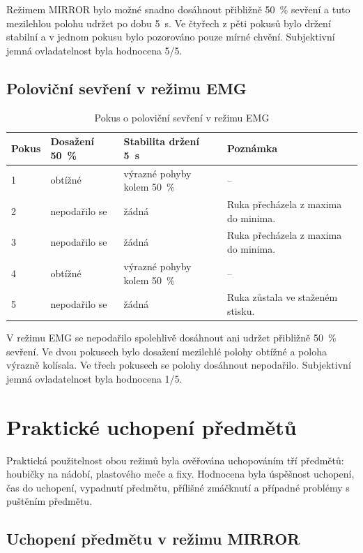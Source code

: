 Režimem MIRROR bylo možné snadno dosáhnout přibližně 50~\% sevření a tuto mezilehlou polohu udržet po dobu 5~s. Ve čtyřech z pěti pokusů bylo držení stabilní a v jednom pokusu bylo pozorováno pouze mírné chvění. Subjektivní jemná ovladatelnost byla hodnocena 5/5.

\subsection{Poloviční sevření v režimu EMG}
\label{subsec:polovicni-emg}

\begin{table}[H]
\centering
\caption{Pokus o poloviční sevření v režimu EMG}
\label{tab:emg-polovicni-sevreni}
\setlength{\tabcolsep}{2pt}
\begin{tabular}{|p{}|p{}|p{}|p{}|}
\hline
\textbf{Pokus} & \textbf{Dosažení 50~\%} & \textbf{Stabilita držení 5~s} & \textbf{Poznámka} \\
\hline
1 & obtížné & výrazné pohyby kolem 50~\% & -- \\
\hline
2 & nepodařilo se & žádná & Ruka přecházela z maxima do minima. \\
\hline
3 & nepodařilo se & žádná & Ruka přecházela z maxima do minima. \\
\hline
4 & obtížné & výrazné pohyby kolem 50~\% & -- \\
\hline
5 & nepodařilo se & žádná & Ruka zůstala ve staženém stisku. \\
\hline
\end{tabular}
\end{table}

V režimu EMG se nepodařilo spolehlivě dosáhnout ani udržet přibližně 50~\% sevření. Ve dvou pokusech bylo dosažení mezilehlé polohy obtížné a poloha výrazně kolísala. Ve třech pokusech se polohy dosáhnout nepodařilo. Subjektivní jemná ovladatelnost byla hodnocena 1/5.

\section{Praktické uchopení předmětů}
\label{sec:uchopeni-predmetu}

Praktická použitelnost obou režimů byla ověřována uchopováním tří předmětů: houbičky na nádobí, plastového meče a fixy. Hodnocena byla úspěšnost uchopení, čas do uchopení, vypadnutí předmětu, přílišné zmáčknutí a případné problémy s puštěním předmětu.

\subsection{Uchopení předmětu v režimu MIRROR}
\label{subsec:uchopeni-mirror}

